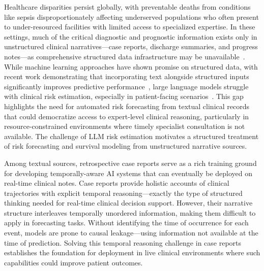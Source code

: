 \documentclass[letterpaper]{article} %
\begin{document}
Healthcare disparities persist globally, with preventable deaths from conditions like sepsis disproportionately affecting underserved populations who often present to under-resourced facilities with limited access to specialized expertise. In these settings, much of the critical diagnostic and prognostic information exists only in unstructured clinical narratives—case reports, discharge summaries, and progress notes—as comprehensive structured data infrastructure may be unavailable~\cite{anzalone2025lower,seinen2025using}. While machine learning approaches have shown promise on structured data, with recent work demonstrating that incorporating text alongside structured inputs significantly improves predictive performance~\citep{kline2022multimodal}, large language models struggle with clinical risk estimation, especially in patient-facing scenarios~\citep{wongposition}.
This gap highlights the need for automated risk forecasting from textual clinical records that could democratize access to expert-level clinical reasoning, particularly in resource-constrained environments where timely specialist consultation is not available.
The challenge of LLM risk estimation motivates a structured treatment of risk forecasting and survival modeling from unstructured narrative sources.

Among textual sources, retrospective case reports serve as a rich training ground for developing temporally-aware AI systems that can eventually be deployed on real-time clinical notes. Case reports provide holistic accounts of clinical trajectories with explicit temporal reasoning—exactly the type of structured thinking needed for real-time clinical decision support. However, their narrative structure interleaves temporally unordered information, making them difficult to apply in forecasting tasks. Without identifying the time of occurrence for each event, models are prone to causal leakage—using information not available at the time of prediction. Solving this temporal reasoning challenge in case reports establishes the foundation for deployment in live clinical environments where such capabilities could improve patient outcomes.

\end{document}

